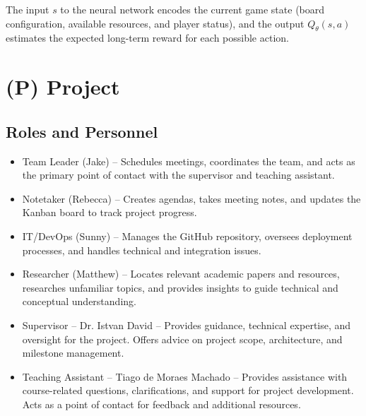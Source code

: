 \documentclass{article}
\begin{document}
The input $s$ to the neural network encodes the current game state (board configuration, available resources, and player status), and the output $Q_{\theta}(s, a)$ estimates the expected long-term reward for each possible action.

\newpage{}


\section*{(P) Project}\label{sec:srs_project}
\renewcommand{\thesubsection}{P.\arabic{subsection}}
\setcounter{subsection}{0}

\subsection{Roles and Personnel}\label{subsec:roles}
\begin{itemize}
    \item {Team Leader (Jake)} – Schedules meetings, coordinates the team, and acts as the primary point of contact with the supervisor and teaching assistant.
    \item {Notetaker (Rebecca)} – Creates agendas, takes meeting notes, and updates the Kanban board to track project progress.
    \item {IT/DevOps (Sunny)} – Manages the GitHub repository, oversees deployment processes, and handles technical and integration issues.
    \item {Researcher (Matthew)} – Locates relevant academic papers and resources, researches unfamiliar topics, and provides insights to guide technical and conceptual understanding.
    \item {Supervisor – Dr. Istvan David} – Provides guidance, technical expertise, and oversight for the project. Offers advice on project scope, architecture, and milestone management.
    \item {Teaching Assistant – Tiago de Moraes Machado} – Provides assistance with course-related questions, clarifications, and support for project development. Acts as a point of contact for feedback and additional resources.
\end{itemize}
\end{document}

